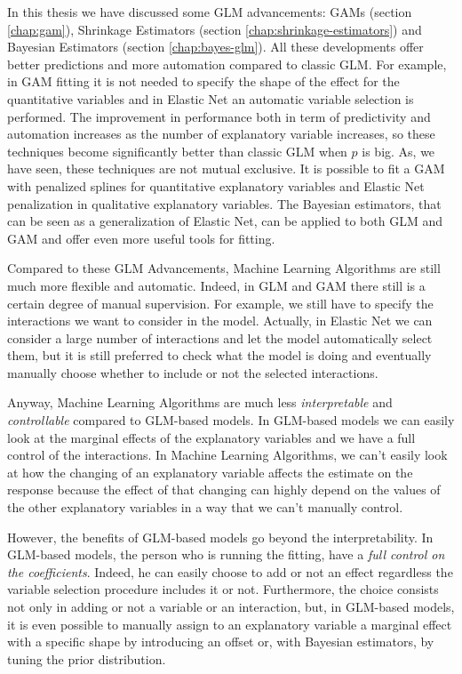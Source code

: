 \documentclass[a4paper, nobind]{templates/ociamthesis}
\theoremstyle{definition}
\theoremstyle{definition}
\theoremstyle{definition}
\theoremstyle{remark}
\begin{document}
In this thesis we have discussed some GLM advancements: GAMs (section \ref{chap:gam}), Shrinkage Estimators (section \ref{chap:shrinkage-estimators}) and Bayesian Estimators (section \ref{chap:bayes-glm}). All these developments offer better predictions and more automation compared to classic GLM. For example, in GAM fitting it is not needed to specify the shape of the effect for the quantitative variables and in Elastic Net an automatic variable selection is performed. The improvement in performance both in term of predictivity and automation increases as the number of explanatory variable increases, so these techniques become significantly better than classic GLM when \(p\) is big. As, we have seen, these techniques are not mutual exclusive. It is possible to fit a GAM with penalized splines for quantitative explanatory variables and Elastic Net penalization in qualitative explanatory variables. The Bayesian estimators, that can be seen as a generalization of Elastic Net, can be applied to both GLM and GAM and offer even more useful tools for fitting.

Compared to these GLM Advancements, Machine Learning Algorithms are still much more flexible and automatic. Indeed, in GLM and GAM there still is a certain degree of manual supervision. For example, we still have to specify the interactions we want to consider in the model. Actually, in Elastic Net we can consider a large number of interactions and let the model automatically select them, but it is still preferred to check what the model is doing and eventually manually choose whether to include or not the selected interactions.

Anyway, Machine Learning Algorithms are much less \emph{interpretable} and \emph{controllable} compared to GLM-based models. In GLM-based models we can easily look at the marginal effects of the explanatory variables and we have a full control of the interactions. In Machine Learning Algorithms, we can't easily look at how the changing of an explanatory variable affects the estimate on the response because the effect of that changing can highly depend on the values of the other explanatory variables in a way that we can't manually control.

However, the benefits of GLM-based models go beyond the interpretability. In GLM-based models, the person who is running the fitting, have a \emph{full control on the coefficients}. Indeed, he can easily choose to add or not an effect regardless the variable selection procedure includes it or not. Furthermore, the choice consists not only in adding or not a variable or an interaction, but, in GLM-based models, it is even possible to manually assign to an explanatory variable a marginal effect with a specific shape by introducing an offset or, with Bayesian estimators, by tuning the prior distribution.
\end{document}
